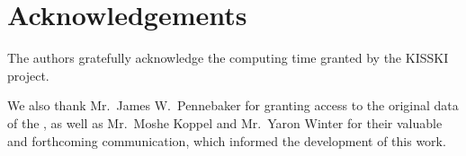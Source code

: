 \section*{Acknowledgements}

The authors gratefully acknowledge the computing time granted by the KISSKI project. 

We also thank Mr.~James W.~Pennebaker for granting access to the original data of the \impAppr{}, as well as Mr.~Moshe Koppel and Mr.~Yaron Winter for their valuable and forthcoming communication, which informed the development of this work.